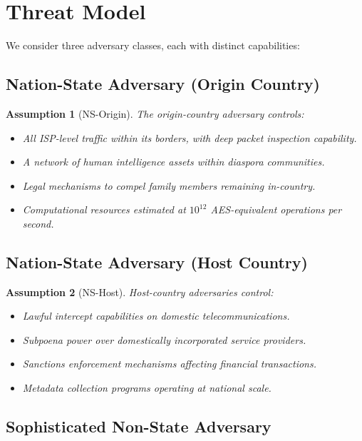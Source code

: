 \documentclass[11pt,a4paper]{article}
\newtheorem{assumption}{Assumption}
\begin{document}
\section{Threat Model}
\label{sec:threat}

We consider three adversary classes, each with distinct capabilities:

\subsection{Nation-State Adversary (Origin Country)}

\begin{assumption}[NS-Origin]
The origin-country adversary controls:
\begin{itemize}
    \item All ISP-level traffic within its borders, with deep packet inspection capability.
    \item A network of human intelligence assets within diaspora communities.
    \item Legal mechanisms to compel family members remaining in-country.
    \item Computational resources estimated at $10^{12}$ AES-equivalent operations per second.
\end{itemize}
\end{assumption}

\subsection{Nation-State Adversary (Host Country)}

\begin{assumption}[NS-Host]
Host-country adversaries control:
\begin{itemize}
    \item Lawful intercept capabilities on domestic telecommunications.
    \item Subpoena power over domestically incorporated service providers.
    \item Sanctions enforcement mechanisms affecting financial transactions.
    \item Metadata collection programs operating at national scale.
\end{itemize}
\end{assumption}

\subsection{Sophisticated Non-State Adversary}
\end{document}
